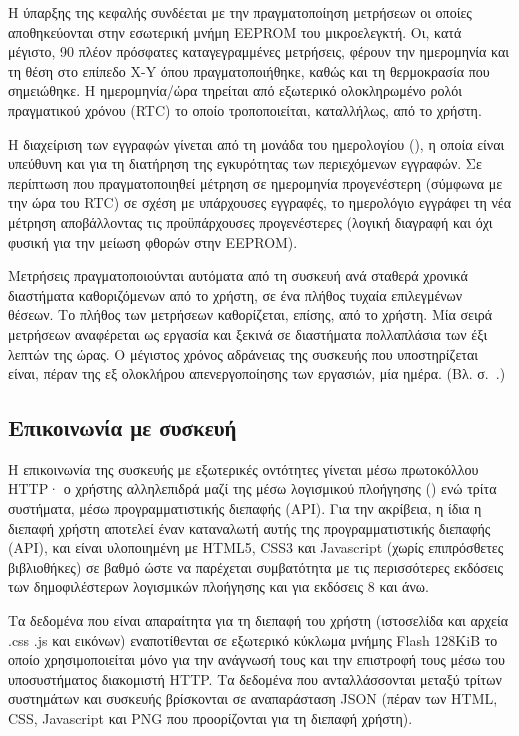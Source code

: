 Η ύπαρξης της κεφαλής συνδέεται με την πραγματοποίηση μετρήσεων οι οποίες
αποθηκεύονται στην εσωτερική μνήμη EEPROM του μικροελεγκτή. Οι, κατά μέγιστο, 90
πλέον πρόσφατες καταγεγραμμένες μετρήσεις, φέρουν την ημερομηνία και τη θέση στο
επίπεδο X-Y όπου πραγματοποιήθηκε, καθώς και τη θερμοκρασία που σημειώθηκε.
Η ημερομηνία\slash{}ώρα τηρείται από εξωτερικό ολοκληρωμένο ρολόι πραγματικού
χρόνου (RTC) το οποίο τροποποιείται, καταλλήλως, από το χρήστη.

Η διαχείριση των εγγραφών γίνεται από τη μονάδα του ημερολογίου (), η
οποία είναι υπεύθυνη και για τη διατήρηση της εγκυρότητας των περιεχόμενων
εγγραφών. Σε περίπτωση που πραγματοποιηθεί μέτρηση σε ημερομηνία προγενέστερη
(σύμφωνα με την ώρα του RTC) σε σχέση με υπάρχουσες εγγραφές, το ημερολόγιο
εγγράφει τη νέα μέτρηση αποβάλλοντας τις προϋπάρχουσες προγενέστερες (λογική
διαγραφή και όχι φυσική για την μείωση φθορών στην EEPROM).

Μετρήσεις πραγματοποιούνται αυτόματα από τη συσκευή ανά σταθερά χρονικά
διαστήματα καθοριζόμενων από το χρήστη, σε ένα πλήθος τυχαία επιλεγμένων θέσεων.
Το πλήθος των μετρήσεων καθορίζεται, επίσης, από το χρήστη. Μία σειρά μετρήσεων
αναφέρεται ως εργασία και ξεκινά σε διαστήματα πολλαπλάσια των έξι λεπτών της
ώρας. Ο μέγιστος χρόνος αδράνειας της συσκευής που υποστηρίζεται είναι, πέραν
της εξ ολοκλήρου απενεργοποίησης των εργασιών, μία ημέρα. (Bλ.
 σ.~\pageref{ch:foundation}.)


\subsection{Επικοινωνία με συσκευή}

Η επικοινωνία της συσκευής με εξωτερικές οντότητες γίνεται μέσω πρωτοκόλλου
HTTP· ο χρήστης αλληλεπιδρά μαζί της μέσω λογισμικού πλοήγησης ()
ενώ τρίτα συστήματα, μέσω προγραμματιστικής διεπαφής (API).
Για την ακρίβεια, η ίδια η διεπαφή χρήστη αποτελεί έναν καταναλωτή αυτής της
προγραμματιστικής διεπαφής (API), και είναι υλοποιημένη με HTML5, CSS3 και
Javascript (χωρίς επιπρόσθετες βιβλιοθήκες) σε βαθμό ώστε να παρέχεται
συμβατότητα με τις περισσότερες εκδόσεις των δημοφιλέστερων λογισμικών πλοήγησης
και για εκδόσεις  8 και άνω.

Τα δεδομένα που είναι απαραίτητα για τη διεπαφή του χρήστη (ιστοσελίδα και
αρχεία \@.css \@.js και εικόνων) εναποτίθενται σε εξωτερικό κύκλωμα μνήμης Flash
128KiB το οποίο χρησιμοποιείται μόνο για την ανάγνωσή τους και την επιστροφή
τους μέσω του υποσυστήματος διακομιστή HTTP.
Τα δεδομένα που ανταλλάσσονται μεταξύ τρίτων συστημάτων και συσκευής βρίσκονται
σε αναπαράσταση JSON (πέραν των HTML, CSS, Javascript και PNG που προορίζονται
για τη διεπαφή χρήστη).

